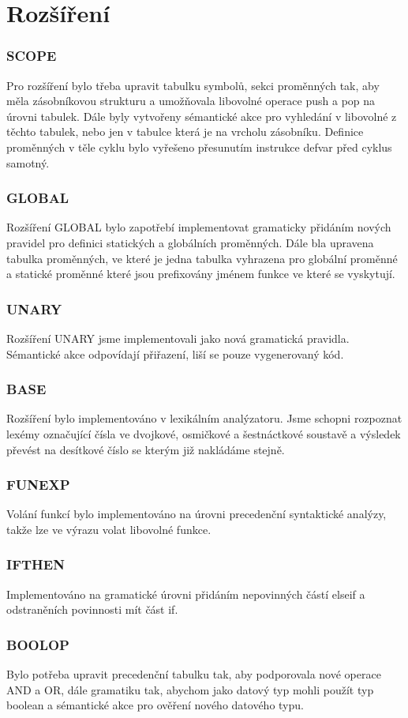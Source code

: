 \section{Rozšíření}

\subsubsection{SCOPE}
Pro rozšíření bylo třeba upravit tabulku symbolů, sekci proměnných tak, aby
měla zásobníkovou strukturu a umožňovala libovolné operace push a pop na úrovni tabulek.
Dále byly vytvořeny sémantické akce pro vyhledání v libovolné z těchto tabulek,
nebo jen v tabulce která je na vrcholu zásobníku. Definice proměnných v těle cyklu
bylo vyřešeno přesunutím instrukce defvar před cyklus samotný.
\subsubsection{GLOBAL}
Rozšíření GLOBAL bylo zapotřebí implementovat gramaticky přidáním
nových pravidel pro definici statických a globálních proměnných.
Dále bla upravena tabulka proměnných, ve které je jedna tabulka vyhrazena
pro globální proměnné a statické proměnné které jsou prefixovány
jménem funkce ve které se vyskytují.
\subsubsection{UNARY}
Rozšíření UNARY jsme implementovali jako nová gramatická pravidla. Sémantické
akce odpovídají přiřazení, liší se pouze vygenerovaný kód.
\subsubsection{BASE}
Rozšíření bylo implementováno v lexikálním analýzatoru. Jsme schopni rozpoznat
lexémy označující čísla ve dvojkové, osmičkové a šestnáctkové soustavě a
výsledek převést na desítkové číslo se kterým již nakládáme stejně.
\subsubsection{FUNEXP}
Volání funkcí bylo implementováno na úrovni precedenční syntaktické analýzy,
takže lze ve výrazu volat libovolné funkce.
\subsubsection{IFTHEN}
Implementováno na gramatické úrovni přidáním nepovinných částí
elseif a odstraněních povinnosti mít část if.
\subsubsection{BOOLOP}
Bylo potřeba upravit precedenční tabulku tak, aby podporovala nové
operace AND a OR, dále gramatiku tak, abychom jako datový typ mohli
použít typ boolean a sémantické akce pro ověření nového datového typu.